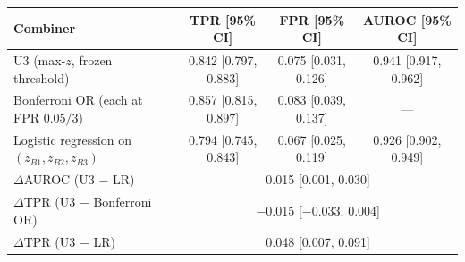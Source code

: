 \begin{tabular}{lccc}
\toprule
Combiner & TPR [95\% CI] & FPR [95\% CI] & AUROC [95\% CI] \\
\midrule
U3 (max-$z$, frozen threshold) & 0.842 [0.797, 0.883] & 0.075 [0.031, 0.126] & 0.941 [0.917, 0.962] \\
Bonferroni OR (each at FPR $0.05/3$) & 0.857 [0.815, 0.897] & 0.083 [0.039, 0.137] & --- \\
Logistic regression on $(z_{B1},z_{B2},z_{B3})$ & 0.794 [0.745, 0.843] & 0.067 [0.025, 0.119] & 0.926 [0.902, 0.949] \\
\midrule
$\Delta$AUROC (U3 $-$ LR) & \multicolumn{3}{c}{0.015 [0.001, 0.030]} \\
$\Delta$TPR (U3 $-$ Bonferroni OR) & \multicolumn{3}{c}{\ensuremath{-}0.015 [\ensuremath{-}0.033, 0.004]} \\
$\Delta$TPR (U3 $-$ LR) & \multicolumn{3}{c}{0.048 [0.007, 0.091]} \\
\bottomrule
\end{tabular}
